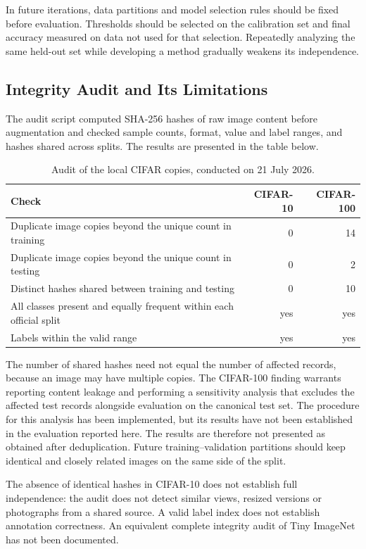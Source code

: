\documentclass[12pt,a4paper]{article}
\begin{document}
In future iterations, data partitions and model selection rules should
be fixed before evaluation. Thresholds should be selected on the calibration
set and final accuracy measured on data not used for that selection.
Repeatedly analyzing the same held-out set while developing a method
gradually weakens its independence.

\subsection{Integrity Audit and Its Limitations}

The audit script computed SHA-256 hashes of raw image content before
augmentation and checked sample counts, format, value and label ranges,
and hashes shared across splits. The results are presented in the table below.

\begin{table}[htbp]
\centering\small
\caption{Audit of the local CIFAR copies, conducted on 21 July 2026.}
\begin{tabularx}{\textwidth}{@{}Yrr@{}}
\toprule
Check & CIFAR-10 & CIFAR-100 \\
\midrule
Duplicate image copies beyond the unique count in training & 0 & 14 \\
Duplicate image copies beyond the unique count in testing & 0 & 2 \\
Distinct hashes shared between training and testing & 0 & 10 \\
All classes present and equally frequent within each official split & yes & yes \\
Labels within the valid range & yes & yes \\
\bottomrule
\end{tabularx}
\end{table}

The number of shared hashes need not equal the number of affected records,
because an image may have multiple copies. The CIFAR-100 finding warrants
reporting content leakage and performing a sensitivity analysis that
excludes the affected test records alongside evaluation on the canonical
test set. The procedure for this analysis has been implemented, but
its results have not been established in the evaluation reported here.
The results are therefore not presented as obtained after deduplication.
Future training--validation partitions should keep identical and closely
related images on the same side of the split.

The absence of identical hashes in CIFAR-10 does not establish full
independence: the audit does not detect similar views, resized versions
or photographs from a shared source. A valid label index does not establish
annotation correctness. An equivalent complete integrity audit of
Tiny ImageNet has not been documented.
\end{document}
